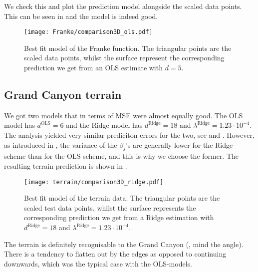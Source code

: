 We check this and plot the prediction model alongside the scaled data points. This can be seen in  and the model is indeed good. 

\begin{figure}
    \texttt{[image: Franke/comparison3D\_ols.pdf]}
    \caption{Best fit model of the Franke function. The triangular points are the scaled data points, whilst the surface represent the corresponding prediction we get from an OLS estimate with $d=5$. }
    \label{fig:franke_final_model}
\end{figure}



\subsection{Grand Canyon terrain}

We got two models that in terms of MSE were almost equally good. The OLS model has $d^\text{OLS}=6$ and the Ridge model has $d^\text{Ridge}=18$ and $\lambda^\text{Ridge}=1.23\cdot10^{-4}$. The analysis yielded very similar prediciton errors for the two, see  and . However, as introduced in , the variance of the $\beta_j$'s are generally lower for the Ridge scheme than for the OLS scheme, and this is why we choose the former. The resulting terrain prediction is shown in .


\begin{figure}
    \texttt{[image: terrain/comparison3D\_ridge.pdf]}
    \caption{Best fit model of the terrain data. The triangular points are the scaled test data points, whilst the surface represents the corresponding prediction we get from a Ridge estimation with $d^\text{Ridge}=18$ and $\lambda^\text{Ridge}=1.23\cdot 10^{-4}$.}
    \label{fig:gc_final_model}
\end{figure}

The terrain is definitely recognisable to the Grand Canyon (, mind the angle). There is a tendency to flatten out by the edges as opposed to continuing downwards, which was the typical case with the OLS-models.
